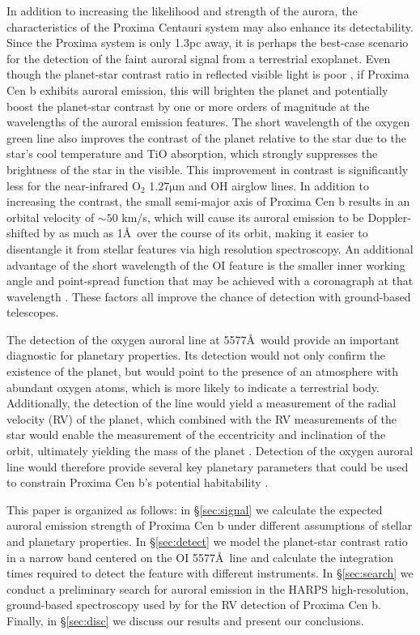 \documentclass{emulateapj}
\begin{document}
In addition to increasing the likelihood and strength of the aurora, the characteristics of the Proxima Centauri system may also enhance its detectability. Since the Proxima system is only 1.3pc away, it is perhaps the best-case scenario for the detection of the faint auroral signal from a terrestrial exoplanet. Even though the planet-star contrast ratio in reflected visible light is poor \citep[${\lesssim} 10^{-7}$; see][]{Turbet2016,Kreidberg2016,Meadows2016}, if Proxima Cen b exhibits auroral emission, this will brighten the planet and potentially boost the planet-star contrast by one or more orders of magnitude at the wavelengths of the auroral emission features. The short wavelength of the oxygen green line also improves the contrast of the planet relative to the star due to the star's cool temperature and TiO absorption, which strongly suppresses the brightness of the star in the visible. This improvement in contrast is significantly less for the near-infrared O$_2$ 1.27$\mathrm{\mu}$m and OH airglow lines. In addition to increasing the contrast, the small semi-major axis of Proxima Cen b results in an orbital velocity of ${\sim} 50$ km/s, which will cause its auroral emission to be Doppler-shifted by as much as 1\AA\ over the course of its orbit, making it easier to disentangle it from stellar features via high resolution spectroscopy. An additional advantage of the short wavelength of the OI feature is the smaller inner working angle and point-spread function that may be achieved with a coronagraph at that wavelength \citep{Agol2007}. These factors all improve the chance of detection with ground-based telescopes.

The detection of the oxygen auroral line at 5577\AA\ would provide an important diagnostic for planetary properties. Its detection would not only confirm the existence of the planet, but would point to the presence of an atmosphere with abundant oxygen atoms, which is more likely to indicate a terrestrial body. Additionally, the detection of the line would yield a measurement of the radial velocity (RV) of the planet, which combined with the RV measurements of the star \citep{Anglada-Escude2016} would enable the measurement of the eccentricity and inclination of the orbit, ultimately yielding the mass of the planet \citep[see, e.g.,][]{LovisFischer2010}. Detection of the oxygen auroral line would therefore provide several key planetary parameters that could be used to constrain Proxima Cen b's potential habitability \citep{Barnes2016,Meadows2016}.

This paper is organized as follows: in \S\ref{sec:signal} we calculate the expected auroral emission strength of Proxima Cen b under different assumptions of stellar and planetary properties. In \S\ref{sec:detect} we model the planet-star contrast ratio in a narrow band centered on the OI 5577\AA\ line and calculate the integration times required to detect the feature with different instruments. In \S\ref{sec:search} we conduct a preliminary search for auroral emission in the HARPS high-resolution, ground-based spectroscopy used by \citet{Anglada-Escude2016} for the RV detection of Proxima Cen b. Finally, in \S\ref{sec:disc} we discuss our results and present our conclusions.
\end{document}
